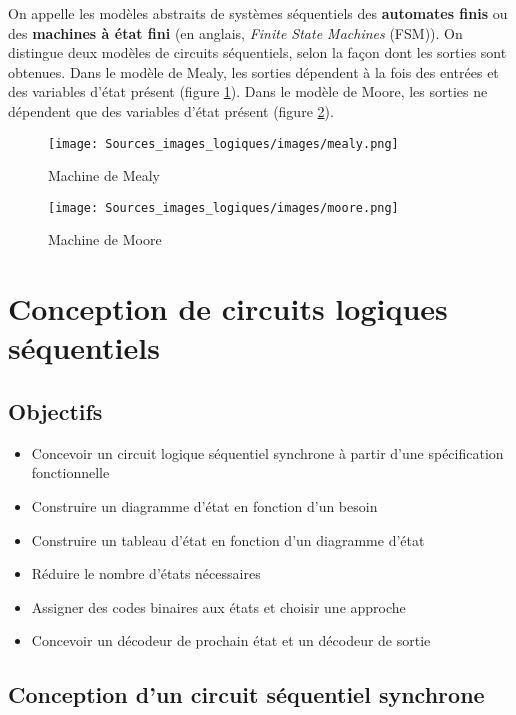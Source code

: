 \documentclass[letter, oneside]{book}
\begin{document}
On appelle les modèles abstraits de systèmes séquentiels des
\textbf{automates finis} ou des \textbf{machines à état fini} (en anglais, \emph{Finite
State Machines} (FSM)).  On distingue deux modèles de circuits
séquentiels, selon la façon dont les sorties sont obtenues. Dans le
modèle de Mealy, les sorties dépendent à la fois des entrées et des
variables d'état présent (figure \ref{fig:orgbd8cead}). Dans le modèle de Moore,
les sorties ne dépendent que des variables d'état présent (figure
\ref{fig:orgc43f99f}).

\begin{figure}[htbp]
\centering
\texttt{[image: Sources\_images\_logiques/images/mealy.png]}
\caption{\label{fig:orgbd8cead}Machine de Mealy}
\end{figure}

\begin{figure}[htbp]
\centering
\texttt{[image: Sources\_images\_logiques/images/moore.png]}
\caption{\label{fig:orgc43f99f}Machine de Moore}
\end{figure}

\chapter{Conception de circuits logiques séquentiels}
\label{sec:orge1521b6}
\section{Objectifs}
\label{sec:org5adafb8}
\begin{itemize}
\item Concevoir un circuit logique séquentiel synchrone à partir
d'une spécification fonctionnelle
\item Construire un diagramme d'état en fonction d'un besoin
\item Construire un tableau d'état en fonction d'un diagramme d'état
\item Réduire le nombre d'états nécessaires
\item Assigner des codes binaires aux états et choisir une approche
\item Concevoir un décodeur de prochain état et un décodeur de sortie
\end{itemize}

\section{Conception d'un circuit séquentiel synchrone}
\label{sec:org0265850}
\end{document}
